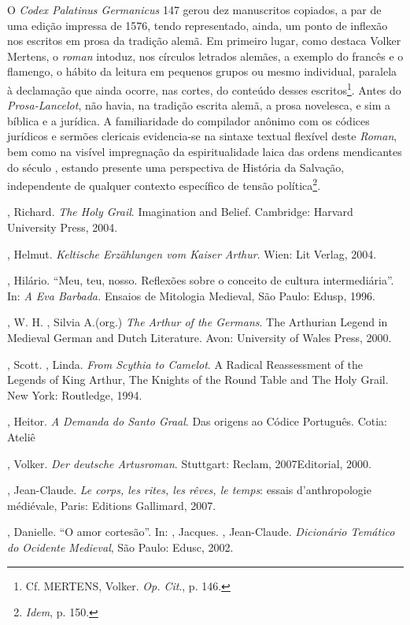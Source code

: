 O \textit{Codex Palatinus Germanicus} 147 gerou dez manuscritos copiados, a par
de uma edição impressa de 1576, tendo representado, ainda, um ponto de inflexão
nos escritos em prosa da tradição alemã. Em primeiro lugar, como destaca Volker
Mertens, o \textit{roman} intoduz, nos círculos letrados alemães, a exemplo do
francês e o flamengo, o hábito da leitura em pequenos grupos ou mesmo
individual, paralela à declamação que ainda ocorre, nas cortes, do conteúdo
desses escritos\footnote{ Cf. MERTENS, Volker. \textit{Op. Cit}., p. 146. }.
Antes do \textit{Prosa-Lancelot}, não havia, na tradição escrita alemã, a prosa
novelesca, e sim a bíblica e a jurídica. A familiaridade do compilador anônimo
com os códices jurídicos e sermões clericais evidencia-se na sintaxe textual
flexível deste \textit{Roman}, bem como na visível impregnação da
espiritualidade laica das ordens mendicantes do século , estando presente
uma perspectiva de História da Salvação, independente de qualquer contexto
específico de tensão política\footnote{ \textit{Idem}, p. 150. }.

\begin{bibliohedra}

, Richard. \textit{ The Holy Grail}. Imagination and Belief. Cambridge:
Harvard University Press, 2004.

, Helmut. \textit{Keltische Erzählungen vom Kaiser Arthur}. Wien: Lit
Verlag, 2004.

, Hilário. “Meu, teu, nosso. Reflexões sobre o conceito de cultura
intermediária”. In: \textit{A Eva Barbada. }Ensaios de Mitologia Medieval, São
Paulo: Edusp, 1996.

, W. H. , Silvia A.(org.) \textit{The Arthur of the Germans}. The
Arthurian Legend in Medieval German and Dutch Literature. Avon: University of
Wales Press, 2000. 

, Scott. , Linda. \textit{From Scythia to Camelot}. A Radical
Reassessment of the Legends of King Arthur, The Knights of the Round Table and
The Holy Grail. New York: Routledge, 1994.

, Heitor. \textit{A Demanda do Santo Graal}. Das origens ao Códice
Português. Cotia: Ateliê 

, Volker. \textit{Der deutsche Artusroman}. Stuttgart: Reclam,
2007Editorial, 2000.

, Jean-Claude. \textit{Le corps, les rites, les rêves, le temps}: essais
d’anthropologie médiévale, Paris: Editions Gallimard, 2007.

, Danielle. “O amor cortesão”. In: , Jacques. ,
Jean-Claude. \textit{Dicionário Temático do Ocidente Medieval}, São Paulo:
Edusc, 2002.
\end{bibliohedra}


